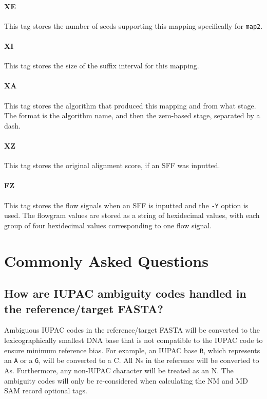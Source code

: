 \documentclass[a4paper,12pt]{book}
\newcommand{\TT}[1]{{\tt #1}} %
\begin{document}
\subsubsection{XE}
This tag stores the number of seeds supporting this mapping specifically for \TT{map2}.

\subsubsection{XI}
This tag stores the size of the suffix interval for this mapping.

\subsubsection{XA}
This tag stores the algorithm that produced this mapping and from what stage.
The format is the algorithm name, and then the zero-based stage, separated by a dash.

\subsubsection{XZ}
This tag stores the original alignment score, if an SFF was inputted.

\subsubsection{FZ}
This tag stores the flow signals when an SFF is inputted and the \TT{-Y} option is used.
The flowgram values are stored as a string of hexidecimal values, with each group of four hexidecimal values corresponding to one flow signal.

\chapter{Commonly Asked Questions}
\label{chap:faq}

\section{How are IUPAC ambiguity codes handled in the reference/target FASTA?}
\label{sec:iupac}
Ambiguous IUPAC codes in the reference/target FASTA will be converted to the lexicographically smallest DNA base that is not compatible to the IUPAC code to ensure minimum reference bias.
For example, an IUPAC base \TT{R}, which represents an \TT{A} or a \TT{G}, will be converted to a C.
All Ns in the reference will be converted to As.
Furthermore, any non-IUPAC character will be treated as an N.
The ambiguity codes will only be re-considered when calculating the NM and MD SAM record optional tags.
\end{document}
